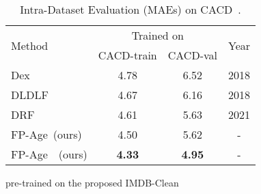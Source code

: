 \begin{table}[tb]
	\caption{Intra-Dataset Evaluation (MAEs) on CACD~\cite{chenFaceRecognitionRetrieval2015}.}\label{tab:cacd-results}
	\begin{center}
	\begin{threeparttable}
		\begin{tabular}{l|c|c|c}
    		\toprule
			\multirow{2}{*}{Method} & \multicolumn{2}{c|}{Trained on} &\multirow{2}{*}{Year} \\
			& CACD-train & CACD-val & \\
			\midrule \midrule
			Dex\cite{rotheDeepExpectationReal2018} & 4.78 & 6.52 & 2018 \\
			DLDLF~\cite{shenDeepRegressionForests2018} & 4.67 & 6.16 & 2018 \\
			DRF~\cite{shenDeepDifferentiableRandom2021} &4.61 & 5.63 & 2021 \\
			\hline
			FP-Age~(ours) & 4.50 & 5.62 & -\\
			FP-Age\tnote{}~~(ours) & \textbf{4.33} &  \textbf{4.95} & - \\ \bottomrule
		\end{tabular}
    \begin{tablenotes}
    \item  pre-trained on the proposed IMDB-Clean 
    \end{tablenotes}
	\end{threeparttable}
	\end{center}
\end{table}

    	
	




